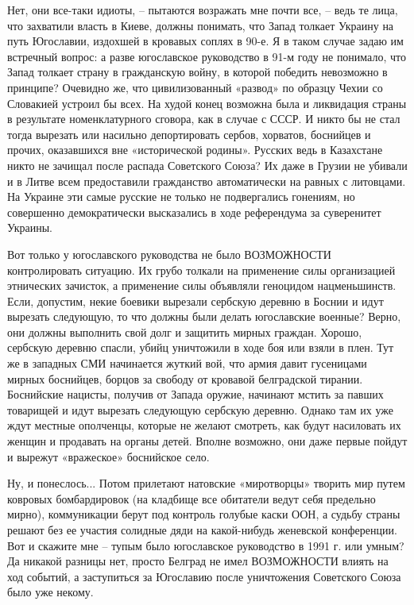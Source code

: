 Нет, они все-таки идиоты, – пытаются возражать мне почти все, – ведь те лица,
что захватили власть в Киеве,  должны понимать, что Запад толкает Украину на
путь Югославии, издохшей в кровавых соплях в 90-е. Я в таком случае задаю им
встречный вопрос: а разве югославское руководство в 91-м году не понимало, что
Запад толкает страну в гражданскую войну, в которой победить невозможно в
принципе? Очевидно же, что цивилизованный «развод» по образцу Чехии со
Словакией устроил бы всех. На худой конец возможна была и ликвидация страны в
результате номенклатурного сговора, как в случае с СССР. И никто бы не стал
тогда вырезать или насильно депортировать сербов, хорватов, боснийцев и прочих,
оказавшихся вне «исторической родины». Русских ведь в Казахстане никто не
зачищал после распада Советского Союза? Их даже в Грузии не убивали и в Литве
всем предоставили гражданство автоматически на равных с литовцами. На Украине
эти самые русские не только не подвергались гонениям, но совершенно
демократически высказались в ходе референдума за суверенитет  Украины.

Вот только у югославского руководства не было ВОЗМОЖНОСТИ контролировать
ситуацию. Их грубо толкали на применение силы организацией этнических зачисток,
а применение силы объявляли геноцидом нацменьшинств. Если,  допустим, некие
боевики вырезали сербскую деревню в Боснии и идут вырезать следующую, то что
должны были делать югославские военные? Верно, они должны выполнить свой долг и
защитить мирных граждан. Хорошо, сербскую деревню спасли, убийц уничтожили в
ходе боя или взяли в плен. Тут же в западных СМИ начинается жуткий вой, что
армия давит гусеницами мирных боснийцев, борцов за свободу от кровавой
белградской тирании. Боснийские нацисты, получив от Запада оружие, начинают
мстить за павших товарищей и идут вырезать следующую сербскую деревню. Однако
там их уже ждут местные ополченцы, которые не желают смотреть, как будут
насиловать их женщин и продавать на органы детей. Вполне возможно, они даже
первые пойдут и вырежут «вражеское» боснийское село.

Ну, и понеслось...  Потом прилетают натовские «миротворцы» творить мир путем
ковровых бомбардировок (на кладбище все обитатели ведут себя предельно мирно),
коммуникации берут под контроль голубые каски ООН, а судьбу страны решают без
ее участия солидные дяди на какой-нибудь женевской конференции. Вот и скажите
мне – тупым было югославское руководство в 1991 г. или умным? Да никакой
разницы нет, просто Белград не имел ВОЗМОЖНОСТИ влиять на ход событий, а
заступиться за Югославию после уничтожения Советского Союза было уже некому.

